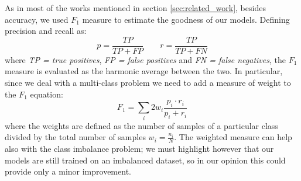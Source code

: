 As in most of the works mentioned in section \ref{sec:related_work}, besides accuracy, we used $F_1$ measure to estimate the goodness of our models. Defining precision and recall as: 
\begin{equation}
	p = \frac{TP}{TP+FP} \qquad r = \frac{TP}{TP+FN}
\end{equation}
where \textit{TP = true positives}, \textit{FP = false positives} and \textit{FN = false negatives}, the $F_1$ measure is evaluated as the harmonic average between the two. In particular, since we deal with a multi-class problem we need to add a measure of weight to the $F_1$ equation:
\begin{equation}
	F_1 = \sum_i 2w_i \frac{p_i \cdot r_i}{p_i + r_i}
\end{equation} 
where the weights are defined as the number of samples of a particular class divided by the total number of samples $w_i = \frac{n_i}{N}$. The weighted measure can help also with the class imbalance problem; we must highlight however that our models are still trained on an imbalanced dataset, so in our opinion this could provide only a minor improvement.

